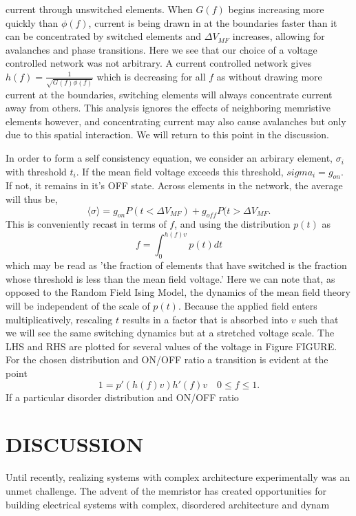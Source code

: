 \documentclass[aps,prl,preprint,groupedaddress]{revtex4-1}
\begin{document}
current through unswitched elements.  When $G(f)$ begins increasing more
quickly than $\phi(f)$, current is being drawn in at the boundaries faster
than it can be concentrated by switched elements and $\Delta V_{MF}$ increases,
allowing for avalanches and phase transitions. Here we see that our choice of
a voltage controlled network was not arbitrary.  A current controlled network
gives $h(f) = \frac{1}{\sqrt{G(f)\phi(f)}}$ which is decreasing for all $f$
as without
drawing more current at the boundaries, switching elements will always
concentrate current away from others. This analysis ignores the effects of
neighboring memristive elements however, and concentrating current may also
cause avalanches but only due to this spatial interaction.  We will return
to this point in the discussion.

In order to form a self consistency equation, we consider an arbirary element,
$\sigma_i$ with threshold $t_i$.  If the mean field voltage exceeds this
threshold, $sigma_i = g_{on}$. If not, it remains in it's OFF state. Across
elements in the network, the average will thus be,
\[\langle \sigma \rangle = g_{on} P(t < \Delta V_{MF}) + 
g_{off} P(t> \Delta V_{MF}.\]
This is conveniently recast in terms of $f$, and using the distribution
$p(t)$ as
\begin{equation}\label{selfconsist}
f = \int_0^{h(f) v} p(t) dt
\end{equation}
which may be read as 'the fraction of elements that have switched is the
fraction whose threshold is less than the mean field voltage.' Here we can
note that, as opposed to the Random Field Ising Model, the dynamics of the
mean field theory will be independent of the scale of $p(t)$.  Because the
applied field enters multiplicatively, rescaling $t$ results in a factor that
is absorbed into $v$ such that we will see the same switching dynamics but
at a stretched voltage scale. The LHS and
RHS are plotted for several values of the voltage in Figure FIGURE.  For
the chosen distribution and ON/OFF ratio a transition is evident at the
point
\begin{equation}\label{PT_eqn}
1 = p'(h(f)v)h'(f)v \quad 0\le f\le 1.
\end{equation}
If a particular disorder distribution and ON/OFF ratio

\section{DISCUSSION}


Until recently, realizing systems with complex architecture
experimentally was an unmet challenge.  The advent of the memristor has
created opportunities for building electrical systems with complex, disordered
architecture and dynam
\end{document}
